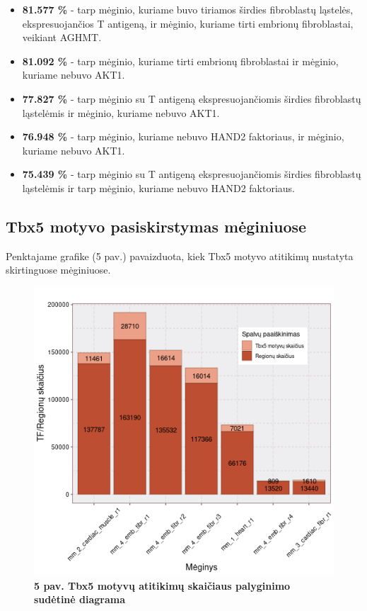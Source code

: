 \documentclass[12pt]{article}
\begin{document}
\begin{itemize}
    \item \textbf{81.577 \%} - tarp mėginio, kuriame buvo tiriamos širdies
        fibroblastų ląstelės, ekspresuojančios T antigeną, ir mėginio, kuriame
        tirti embrionų fibroblastai, veikiant AGHMT.
    \item \textbf{81.092 \%} - tarp mėginio, kuriame tirti embrionų
        fibroblastai ir mėginio, kuriame nebuvo AKT1.
    \item \textbf{77.827 \%} - tarp mėginio su T antigeną ekspresuojančiomis
        širdies fibroblastų ląstelėmis ir mėginio, kuriame nebuvo AKT1.
    \item \textbf{76.948 \%} - tarp mėginio, kuriame nebuvo HAND2 faktoriaus,
        ir mėginio, kuriame nebuvo AKT1.
    \item \textbf{75.439 \%} - tarp mėginio su T antigeną ekspresuojančiomis
        širdies fibroblastų ląstelėmis ir tarp mėginio, kuriame nebuvo HAND2
        faktoriaus.
  \end{itemize}


\subsection{Tbx5 motyvo pasiskirstymas mėginiuose}
Penktajame grafike (5 pav.) pavaizduota, kiek Tbx5 motyvo atitikimų nustatyta
skirtinguose mėginiuose.

\begin{figure}[htb]
    \begin{center}
        \includegraphics[width=0.6\linewidth]{../Figures/tf_hit_percentage.png}
        \caption*{\small\textbf{5 pav. Tbx5 motyvų atitikimų skaičiaus palyginimo
                                sudėtinė diagrama}}
    \end{center}
\end{figure}
\end{document}
